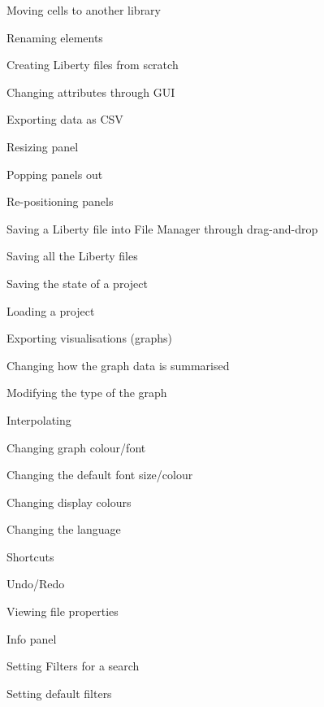 \documentclass[10pt,a4paper]{report}
\begin{document}
\begin{FRO}
    \item Moving cells to another library \label{FRO-1}
    \item Renaming elements \label{FRO-2}
    \item Creating Liberty files from scratch \label{FRO-3}
    \item Changing attributes through GUI \label{FRO-4}
    \item Exporting data as CSV \label{FRO-5}
    \item Resizing panel \label{FRO-6}
    \item Popping panels out \label{FRO-7}
    \item Re-positioning panels \label{FRO-8}
    \item Saving a Liberty file into File Manager through drag-and-drop \label{FRO-9}
    \item Saving all the Liberty files \label{FRO-10} %
    \item Saving the state of a project \label{FRO-11}
    \item Loading a project \label{FRO-12}
    \item Exporting visualisations (graphs) \label{FRO-13}
    \item Changing how the graph data is summarised \label{FRO-14}
    \item Modifying the type of the graph \label{FRO-15}
    \item Interpolating \label{FR-16}
    \item Changing graph colour/font \label{FRO-17}
    \item Changing the default font size/colour \label{FRO-18}
    \item Changing display colours \label{FRO-19}
    \item Changing the language \label{FRO-20}
    \item Shortcuts \label{FRO-21}
    \item Undo/Redo \label{FRO-22}
    \item Viewing file properties \label{FRO-23}
    \item Info panel \label{24} %
    \item Setting Filters for a search \label{FRO-25}
    \item Setting default filters\label{FRO-26}
\end{FRO}
\end{document}
